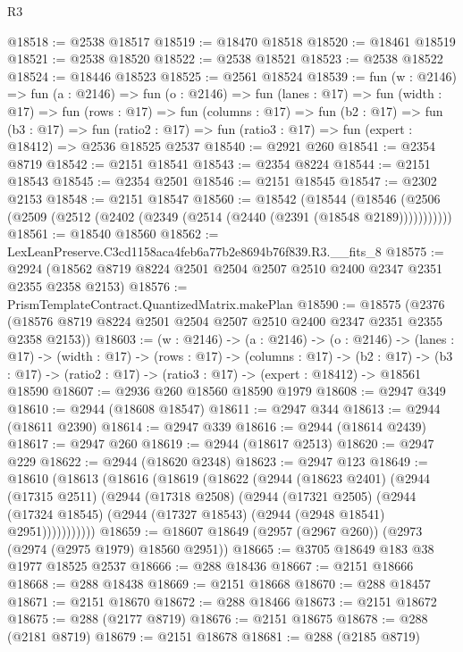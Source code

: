 \begin{lexlean}{R3}
\begin{coremodule}
@18518 := @2538 @18517
@18519 := @18470 @18518
@18520 := @18461 @18519
@18521 := @2538 @18520
@18522 := @2538 @18521
@18523 := @2538 @18522
@18524 := @18446 @18523
@18525 := @2561 @18524
@18539 := fun (w : @2146) =>
  fun (a : @2146) =>
  fun (o : @2146) =>
  fun (lanes : @17) =>
  fun (width : @17) =>
  fun (rows : @17) =>
  fun (columns : @17) =>
  fun (b2 : @17) =>
  fun (b3 : @17) =>
  fun (ratio2 : @17) => fun (ratio3 : @17) => fun (expert : @18412) => @2536 @18525 @2537
@18540 := @2921 @260
@18541 := @2354 @8719
@18542 := @2151 @18541
@18543 := @2354 @8224
@18544 := @2151 @18543
@18545 := @2354 @2501
@18546 := @2151 @18545
@18547 := @2302 @2153
@18548 := @2151 @18547
@18560 := @18542
    (@18544 (@18546 (@2506 (@2509 (@2512 (@2402 (@2349 (@2514 (@2440 (@2391 (@18548 @2189)))))))))))
@18561 := @18540 @18560
@18562 := LexLeanPreserve.C3cd1158aca4feb6a77b2e8694b76f839.R3.__fits_8
@18575 := @2924 (@18562 @8719 @8224 @2501 @2504 @2507 @2510 @2400 @2347 @2351 @2355 @2358 @2153)
@18576 := PrismTemplateContract.QuantizedMatrix.makePlan
@18590 := @18575
    (@2376 (@18576 @8719 @8224 @2501 @2504 @2507 @2510 @2400 @2347 @2351 @2355 @2358 @2153))
@18603 := (w : @2146) ->
  (a : @2146) ->
  (o : @2146) ->
  (lanes : @17) ->
  (width : @17) ->
  (rows : @17) ->
  (columns : @17) ->
  (b2 : @17) -> (b3 : @17) -> (ratio2 : @17) -> (ratio3 : @17) -> (expert : @18412) -> @18561 @18590
@18607 := @2936 @260 @18560 @18590 @1979
@18608 := @2947 @349
@18610 := @2944 (@18608 @18547)
@18611 := @2947 @344
@18613 := @2944 (@18611 @2390)
@18614 := @2947 @339
@18616 := @2944 (@18614 @2439)
@18617 := @2947 @260
@18619 := @2944 (@18617 @2513)
@18620 := @2947 @229
@18622 := @2944 (@18620 @2348)
@18623 := @2947 @123
@18649 := @18610
    (@18613
      (@18616
        (@18619
          (@18622
            (@2944
              (@18623 @2401)
              (@2944
                (@17315 @2511)
                (@2944
                  (@17318 @2508)
                  (@2944
                    (@17321 @2505)
                    (@2944
                      (@17324 @18545)
                      (@2944 (@17327 @18543) (@2944 (@2948 @18541) @2951)))))))))))
@18659 := @18607 @18649 (@2957 (@2967 @260)) (@2973 (@2974 (@2975 @1979) @18560 @2951))
@18665 := @3705 @18649 @183 @38 @1977 @18525 @2537
@18666 := @288 @18436
@18667 := @2151 @18666
@18668 := @288 @18438
@18669 := @2151 @18668
@18670 := @288 @18457
@18671 := @2151 @18670
@18672 := @288 @18466
@18673 := @2151 @18672
@18675 := @288 (@2177 @8719)
@18676 := @2151 @18675
@18678 := @288 (@2181 @8719)
@18679 := @2151 @18678
@18681 := @288 (@2185 @8719)

\end{coremodule}
\end{lexlean}
